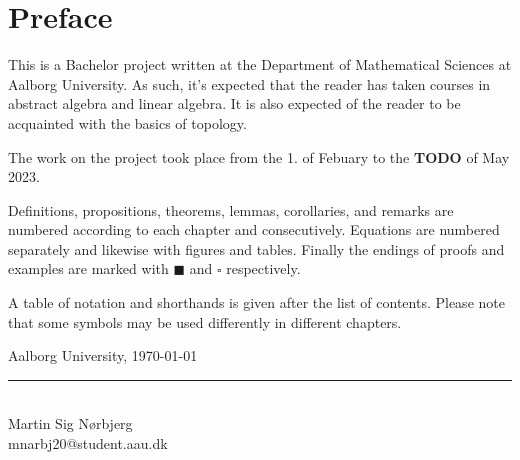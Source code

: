\chapter{Preface}

This is a Bachelor project written at the Department of Mathematical Sciences at Aalborg University.
As such, it's expected that the reader has taken courses in abstract algebra and linear algebra.
It is also expected of the reader to be acquainted with the basics of topology.

The work on the project took place from the 1. of Febuary to the \textbf{TODO} of May 2023.


Definitions, propositions, theorems, lemmas, corollaries, and remarks are numbered according to each chapter and consecutively.
Equations are numbered separately and likewise with figures and tables.
Finally the endings of proofs and examples are marked with $\blacksquare$ and $\square$ respectively.

A table of notation and shorthands is given after the list of contents. 
Please note that some symbols may be used differently in different chapters.

\vspace{\baselineskip}\hfill Aalborg University, \today
\vfill\noindent

\begin{minipage}[H]{\textwidth}
 \centering
 \rule{\textwidth / 2}{1pt}\\
  Martin Sig Nørbjerg\\
 {\footnotesize mnarbj20@student.aau.dk}
\end{minipage}
\hfill
